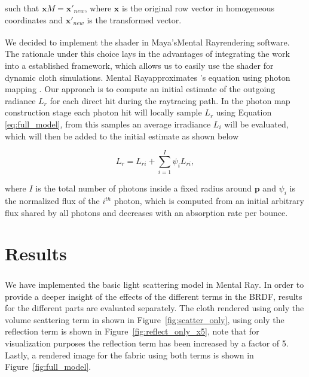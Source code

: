 \documentclass[12pt]{article}
\begin{document}
such that $\mathbf{x}M=\mathbf{x}'_{new}$, where $\mathbf{x}$ is the original row vector in homogeneous coordinates and $\mathbf{x}'_{new}$ is the transformed vector.

We decided to implement the shader in Maya's\textsuperscript\textregistered Mental Ray\textsuperscript\textregistered rendering software.
The rationale under this choice lays in the advantages of integrating the work into a established framework, which allows us to easily use the shader for dynamic cloth simulations.
Mental Ray\texttrademark approximates \citeauthor{Kajiya1986}'s equation \cite{Kajiya1986} using photon mapping \cite{Jensen1996}.
Our approach is to compute an initial estimate of the outgoing radiance $L_{r}$ for each direct hit during the raytracing path.
In the photon map construction stage each photon hit will locally sample $L_{r}$ using Equation \ref{eq:full_model}, from this samples an average irradiance $L_i$ will be evaluated, which will then be added to the initial estimate as shown below

\begin{equation}
L_r = L_{ri} + \sum_{i = 1}^{I} \psi_i L_{ri},
\end{equation}

where $I$ is the total number of photons inside a fixed radius around $\mathbf{p}$ and $\psi_i$ is the normalized flux of the $i^{th}$ photon, which is computed from an initial arbitrary flux shared by all photons and decreases with an absorption rate per bounce.

\section{Results}

We have implemented the basic light scattering model in Mental Ray\textsuperscript\textregistered.
In order to provide a deeper insight of the effects of the different terms in the BRDF, results for the different parts are evaluated separately.
The cloth rendered using only the volume scattering term in shown in Figure~\ref{fig:scatter_only}, using only the reflection term is shown in Figure~\ref{fig:reflect_only_x5}, note that for visualization purposes the reflection term has been increased by a factor of 5.
Lastly, a rendered image for the fabric using both terms is shown in Figure~\ref{fig:full_model}.
\end{document}
